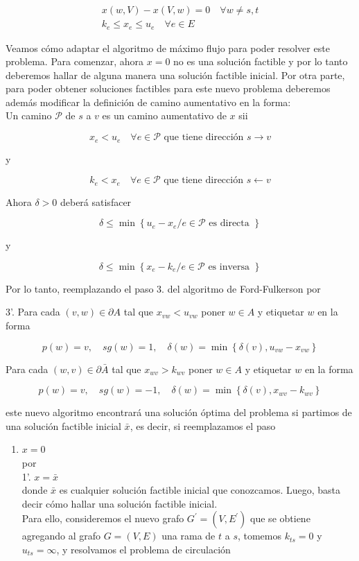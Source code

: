 \documentclass[10pt]{article}
\begin{document}
\begin{gather*}
x(w, V)-x(V, w)=0 \quad \forall w \neq s, t \\
k_{e} \leq x_{e} \leq u_{e} \quad \forall e \in E \tag{2}
\end{gather*}


Veamos cómo adaptar el algoritmo de máximo flujo para poder resolver este problema. Para comenzar, ahora $x=0$ no es una solución factible y por lo tanto deberemos hallar de alguna manera una solución factible inicial. Por otra parte, para poder obtener soluciones factibles para este nuevo problema deberemos además modificar la definición de camino aumentativo en la forma:\\
Un camino $\mathcal{P}$ de $s$ a $v$ es un camino aumentativo de $x$ sii

$$
x_{e}<u_{e} \quad \forall e \in \mathcal{P} \text { que tiene dirección } s \longrightarrow v
$$

y

$$
k_{e}<x_{e} \quad \forall e \in \mathcal{P} \text { que tiene dirección } s \longleftarrow v
$$

Ahora $\delta>0$ deberá satisfacer

$$
\delta \leq \min \left\{u_{e}-x_{e} / e \in \mathcal{P} \text { es directa }\right\}
$$

y

$$
\delta \leq \min \left\{x_{e}-k_{e} / e \in \mathcal{P} \text { es inversa }\right\}
$$

Por lo tanto, reemplazando el paso 3. del algoritmo de Ford-Fulkerson por

3'. Para cada $(v, w) \in \partial A$ tal que $x_{v w}<u_{v w}$ poner $w \in A$ y etiquetar $w$ en la forma

$$
p(w)=v, \quad s g(w)=1, \quad \delta(w)=\min \left\{\delta(v), u_{v w}-x_{v w}\right\}
$$

Para cada $(w, v) \in \partial \bar{A}$ tal que $x_{w v}>k_{w v}$ poner $w \in A$ y etiquetar $w$ en la forma

$$
p(w)=v, \quad s g(w)=-1, \quad \delta(w)=\min \left\{\delta(v), x_{w v}-k_{w v}\right\}
$$

este nuevo algoritmo encontrará una solución óptima del problema si partimos de una solución factible inicial $\bar{x}$, es decir, si reemplazamos el paso

\begin{enumerate}
  \item $x=0$\\
por\\
1'. $x=\bar{x}$\\
donde $\bar{x}$ es cualquier solución factible inicial que conozcamos. Luego, basta decir cómo hallar una solución factible inicial.\\
Para ello, consideremos el nuevo grafo $G^{\prime}=\left(V, E^{\prime}\right)$ que se obtiene agregando al grafo $G=(V, E)$ una rama de $t$ a $s$, tomemos $k_{t s}=0$ y $u_{t s}=\infty$, y resolvamos el problema de circulación
\end{enumerate}
\end{document}
